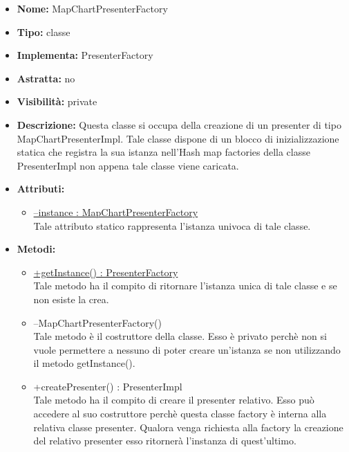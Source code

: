 			
			\begin{itemize}
			\item \textbf{Nome:} MapChartPresenterFactory
			\item \textbf{Tipo:} classe
			
		\item \textbf{Implementa:}
		PresenterFactory
		\item \textbf{Astratta:}
		no
			\item \textbf{Visibilità:} private
			\item \textbf{Descrizione:} Questa classe si occupa della creazione di un presenter di tipo MapChartPresenterImpl. Tale classe dispone di un blocco di inizializzazione statica che registra la sua istanza nell'Hash map factories della classe PresenterImpl non appena tale classe viene caricata.
			\item \textbf{Attributi:}
				\begin{itemize}
				\setlength{\itemsep}{5pt}
				
					\item[\ding{111}] \underline{--instance : MapChartPresenterFactory} \\ [1mm] Tale attributo statico rappresenta l'istanza univoca di tale classe.
				\end{itemize}
		
			\item \textbf{Metodi:}
				\begin{itemize}
				\setlength{\itemsep}{5pt}
				
					\item[\ding{111}] {\underline{+getInstance() : PresenterFactory}} \\ [1mm] Tale metodo ha il compito di ritornare l'istanza unica di tale classe e se non esiste la crea.
					\item[\ding{111}] {{--MapChartPresenterFactory()}} \\ [1mm] Tale metodo è il costruttore della classe. Esso è privato perchè non si vuole permettere a nessuno di poter creare un'istanza se non utilizzando il metodo getInstance().
					\item[\ding{111}] {{+createPresenter() : PresenterImpl}} \\ [1mm] Tale metodo ha il compito di creare il presenter relativo. Esso può accedere al suo costruttore perchè questa classe factory è interna alla relativa classe presenter. Qualora venga richiesta alla factory la creazione del relativo presenter esso ritornerà l'instanza di quest'ultimo.
				\end{itemize}
		
			\end{itemize}

